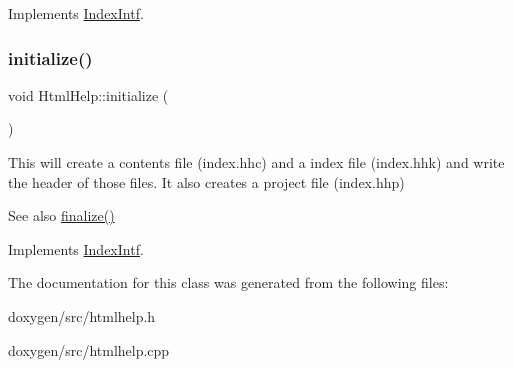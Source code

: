 Implements \mbox{\hyperlink{class_index_intf}{Index\+Intf}}.

\mbox{\label{class_html_help_acf6cb7c477c71f2031b5831f979991d5}} 
\subsubsection{\texorpdfstring{initialize()}{initialize()}}
{\footnotesize\ttfamily void Html\+Help\+::initialize (\begin{DoxyParamCaption}{ }\end{DoxyParamCaption})\hspace{0.3cm}{\ttfamily [virtual]}}

This will create a contents file (index.\+hhc) and a index file (index.\+hhk) and write the header of those files. It also creates a project file (index.\+hhp) \begin{DoxySeeAlso}{See also}
\mbox{\hyperlink{class_html_help_a66375adceef242d73c6554bd7fba6cf7}{finalize()}} 
\end{DoxySeeAlso}


Implements \mbox{\hyperlink{class_index_intf}{Index\+Intf}}.



The documentation for this class was generated from the following files\+:\begin{DoxyCompactItemize}
\item 
doxygen/src/htmlhelp.\+h\item 
doxygen/src/htmlhelp.\+cpp\end{DoxyCompactItemize}
